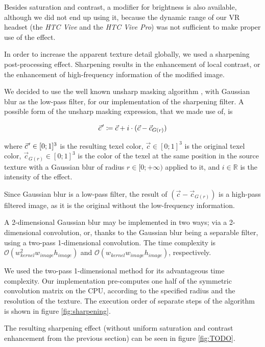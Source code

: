 Besides saturation and contrast, a modifier for brightness is also available, although we did not end up using it, because the dynamic range of our \ac{VR} headset (the \textit{HTC Vive} and the \textit{HTC Vive Pro}) was not sufficient to make proper use of the effect.

In order to increase the apparent texture detail globally, we used a sharpening post-processing effect. Sharpening results in the enhancement of local contrast, or the enhancement of high-frequency information of the modified image.

We decided to use the well known unsharp masking algorithm \autocite{jain1989fundamentals}, with Gaussian blur as the low-pass filter, for our implementation of the sharpening filter. A possible form of the unsharp masking expression, that we made use of, is

\begin{equation}\label{eq:unsharpmask}
    \pvec{c}' \coloneqq \vec{c} + i \cdot (\vec{c} - \vec{c}_{G(r)})
\end{equation}

where $\pvec{c}' \in [0; 1]^3$ is the resulting texel color, $\vec{c} \in [0; 1]^3$ is the original texel color, $\vec{c}_{G(r)} \in [0; 1]^3$ is the color of the texel at the same position in the source texture with a Gaussian blur of radius $r \in [0; +\infty)$ applied to it, and $i \in \mathbb{R}$ is the intensity of the effect.

Since Gaussian blur is a low-pass filter, the result of $(\vec{c} - \vec{c}_{G(r)})$ is a high-pass filtered image, as it is the original without the low-frequency information.

A 2-dimensional Gaussian blur may be implemented in two ways; via a 2-dimensional convolution, or, thanks to the Gaussian blur being a separable filter, using a two-pass 1-dimensional convolution. The time complexity is $\mathcal{O}(w_{kernel}^2w_{image}h_{image})$ and $\mathcal{O}(w_{kernel}w_{image}h_{image})$, respectively.

We used the two-pass 1-dimensional method for its advantageous time complexity. Our implementation pre-computes one half of the symmetric convolution matrix on the CPU, according to the specified radius and the resolution of the texture. The execution order of separate steps of the algorithm is shown in figure \ref{fig:sharpening}.

The resulting sharpening effect (without uniform saturation and contrast enhancement from the previous section) can be seen in figure \ref{fig:TODO}.

